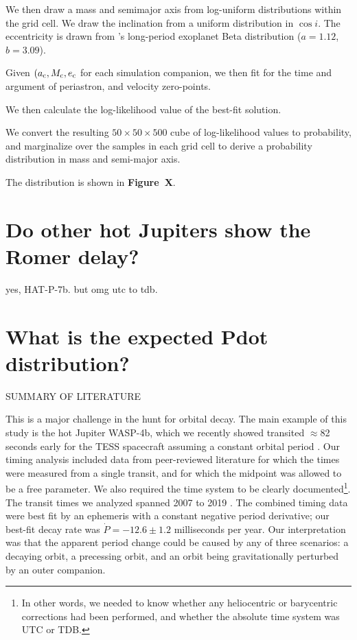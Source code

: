\documentclass[RNAAS]{aastex62}
\begin{document}
We then draw a mass and semimajor axis from log-uniform
distributions within the grid cell. We draw the inclination from a uniform distribution in
$\cos i$.
The eccentricity is drawn from \citet{kipping_beta_2013}'s long-period
exoplanet Beta distribution ($a=1.12$, $b=3.09$).

Given $(a_{\rm c}, M_{\rm c}, e_{\rm c}$ for each simulation companion, we then
fit for the time and argument of periastron, and velocity zero-points.

We then calculate the log-likelihood value of the best-fit solution.

We convert the resulting $50\times50\times500$ cube of log-likelihood
values to probability, and marginalize over the samples in each grid
cell to derive a probability distribution in mass and semi-major axis.

The distribution is shown in {\bf Figure~X}.



\section{Do other hot Jupiters show the Romer delay?}
yes, HAT-P-7b. but omg utc to tdb.


\section{What is the expected Pdot distribution?}






SUMMARY OF LITERATURE

This is a major challenge in the hunt for orbital decay.  The main
example of this study is the hot Jupiter WASP-4b, which we recently
showed transited $\approx$82 seconds early for the TESS spacecraft
assuming a constant orbital period \citep{bouma_wasp-4b_2019}.  Our
timing analysis included data from peer-reviewed literature for which
the times were measured from a single transit, and for which the
midpoint was allowed to be a free parameter. We also required the time
system to be clearly documented\footnote{In other words, we needed to
know whether any heliocentric or barycentric corrections had been
performed, and whether the absolute time system was UTC or TDB.}. The
transit times we analyzed spanned 2007 to 2019
\citep{wilson_wasp-4b_2008,gillon_improved_2009,winn_transit_2009,dragomir_terms_2011,sanchis-ojeda_starspots_2011,nikolov_wasp-4b_2012,hoyer_tramos_2013,ranjan_atmospheric_2014,huitson_gemini_2017}.
The combined timing data were best fit by an ephemeris with a constant
negative period derivative; our best-fit decay rate was $\dot{P} =
-12.6 \pm 1.2$ milliseconds per year.  Our interpretation was that the
apparent period change could be caused by any of three scenarios: a
decaying orbit, a precessing orbit, and an orbit being gravitationally
perturbed by an outer companion.
\end{document}
